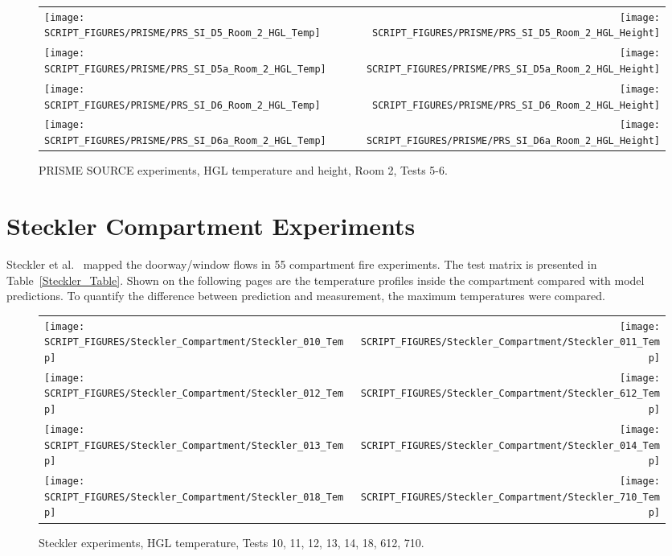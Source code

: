 \begin{figure}[p]
\begin{tabular*}{\textwidth}{l@{\extracolsep{\fill}}r}
\texttt{[image: SCRIPT\_FIGURES/PRISME/PRS\_SI\_D5\_Room\_2\_HGL\_Temp]} &
\texttt{[image: SCRIPT\_FIGURES/PRISME/PRS\_SI\_D5\_Room\_2\_HGL\_Height]} \\
\texttt{[image: SCRIPT\_FIGURES/PRISME/PRS\_SI\_D5a\_Room\_2\_HGL\_Temp]} &
\texttt{[image: SCRIPT\_FIGURES/PRISME/PRS\_SI\_D5a\_Room\_2\_HGL\_Height]} \\
\texttt{[image: SCRIPT\_FIGURES/PRISME/PRS\_SI\_D6\_Room\_2\_HGL\_Temp]} &
\texttt{[image: SCRIPT\_FIGURES/PRISME/PRS\_SI\_D6\_Room\_2\_HGL\_Height]} \\
\texttt{[image: SCRIPT\_FIGURES/PRISME/PRS\_SI\_D6a\_Room\_2\_HGL\_Temp]} &
\texttt{[image: SCRIPT\_FIGURES/PRISME/PRS\_SI\_D6a\_Room\_2\_HGL\_Height]}
\end{tabular*}
\caption[PRISME SOURCE experiments, HGL temperature and height, Room 2, Tests 5-6]
{PRISME SOURCE experiments, HGL temperature and height, Room 2, Tests 5-6.}
\label{PRISME_SI_HGL_2}
\end{figure}

\clearpage

\section{Steckler Compartment Experiments}

Steckler et al.~\cite{Steckler:NBSIR_82-2520} mapped the doorway/window flows in 55 compartment fire experiments. The test matrix is presented in Table~\ref{Steckler_Table}. Shown on the following pages are the temperature profiles inside the compartment compared with model predictions. To quantify the difference between prediction and measurement, the maximum temperatures were compared.

\newpage

\begin{figure}[p]
\begin{tabular*}{\textwidth}{l@{\extracolsep{\fill}}r}
\texttt{[image: SCRIPT\_FIGURES/Steckler\_Compartment/Steckler\_010\_Temp]} &
\texttt{[image: SCRIPT\_FIGURES/Steckler\_Compartment/Steckler\_011\_Temp]} \\
\texttt{[image: SCRIPT\_FIGURES/Steckler\_Compartment/Steckler\_012\_Temp]} &
\texttt{[image: SCRIPT\_FIGURES/Steckler\_Compartment/Steckler\_612\_Temp]} \\
\texttt{[image: SCRIPT\_FIGURES/Steckler\_Compartment/Steckler\_013\_Temp]} &
\texttt{[image: SCRIPT\_FIGURES/Steckler\_Compartment/Steckler\_014\_Temp]} \\
\texttt{[image: SCRIPT\_FIGURES/Steckler\_Compartment/Steckler\_018\_Temp]} &
\texttt{[image: SCRIPT\_FIGURES/Steckler\_Compartment/Steckler\_710\_Temp]}
\end{tabular*}
\caption[Steckler experiments, HGL temperature, Tests 10, 11, 12, 13, 14, 18, 612, 710]
{Steckler experiments, HGL temperature, Tests 10, 11, 12, 13, 14, 18, 612, 710.}
\label{Steckler_Temp_1}
\end{figure}


